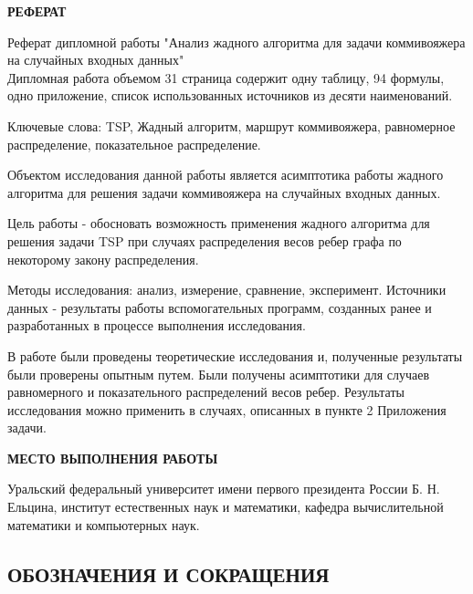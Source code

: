 \documentclass[a4paper, 14pt]{extarticle}
\numberwithin{equation}{section}
\begin{document}
\newpage

\begin{center}
 \textbf{РЕФЕРАТ}
\end{center}

Реферат дипломной работы "Анализ жадного алгоритма для задачи 
коммивояжера на случайных входных данных"\\

Дипломная работа объемом 31 страница содержит одну таблицу, 94 формулы, одно приложение, список использованных источников из десяти наименований.

Ключевые слова: TSP, Жадный алгоритм, маршрут коммивояжера, равномерное распределение, показательное распределение.

Объектом исследования данной работы является асимптотика работы жадного алгоритма для решения задачи коммивояжера на случайных входных данных. 

Цель работы - обосновать возможность применения жадного алгоритма для решения задачи TSP при случаях распределения весов ребер графа по некоторому закону распределения. 

Методы исследования: анализ, измерение, сравнение, эксперимент. Источники данных - результаты работы вспомогательных программ, созданных ранее и разработанных в процессе выполнения исследования.

В работе были проведены теоретические исследования и, полученные результаты были проверены опытным путем. Были получены асимптотики для случаев равномерного и показательного распределений весов ребер. Результаты исследования можно применить в случаях, описанных в пункте 2 Приложения задачи.\\

\newpage

\begin{center}
 \textbf{МЕСТО ВЫПОЛНЕНИЯ РАБОТЫ}
\end{center}

Уральский федеральный университет имени первого президента России Б. Н. Ельцина, институт естественных наук и математики, кафедра вычислительной математики и компьютерных наук.

\newpage

\renewcommand{\contentsname}{\begin{center}Содержание\end{center}}
\tableofcontents

\newpage

\begin{center}
\chapter{\textbf{ОБОЗНАЧЕНИЯ И СОКРАЩЕНИЯ}}
\end{center}
\end{document}
